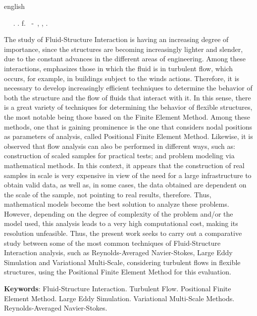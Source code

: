 \documentclass[_ArquivoPrincipal.tex]{subfiles}
\begin{document}
	\begin{resumo}[Abstract]
		\begin{otherlanguage*}{english}
			\begin{flushleft} 
				\setlength{\absparsep}{0pt} %
				\SingleSpacing 
				\imprimirautorabr~ ~\textbf{\imprimirtitleabstract}.	\imprimirdata.  \pageref{LastPage}f. 
				\imprimirtipotrabalho~-~\imprimirinstituicao, \imprimirlocal, 	\imprimirdata. 
			\end{flushleft}
			\OnehalfSpacing 
			The study of Fluid-Structure Interaction is having an increasing degree of importance, since the structures are becoming increasingly lighter and slender, due to the constant advances in the different areas of engineering. Among these interactions, emphasizes those in which the fluid is in turbulent flow, which occurs, for example, in buildings subject to the winds actions. Therefore, it is necessary to develop increasingly efficient techniques to determine the behavior of both the structure and the flow of fluids that interact with it. In this sense, there is a great variety of techniques for determining the behavior of flexible structures, the most notable being those based on the Finite Element Method. Among these methods, one that is gaining prominence is the one that considers nodal positions as parameters of analysis, called Positional Finite Element Method. Likewise, it is observed that flow analysis can also be performed in different ways, such as: construction of scaled samples for practical tests; and problem modeling via mathematical methods. In this context, it appears that the construction of real samples in scale is very expensive in view of the need for a large infrastructure to obtain valid data, as well as, in some cases, the data obtained are dependent on the scale of the sample, not pointing to real results, therefore. Thus, mathematical models become the best solution to analyze these problems. However, depending on the degree of complexity of the problem and/or the model used, this analysis leads to a very high computational cost, making its resolution unfeasible. Thus, the present work seeks to carry out a comparative study between some of the most common techniques of Fluid-Structure Interaction analysis, such as Reynolds-Averaged Navier-Stokes, Large Eddy Simulation and Variational Multi-Scale, considering turbulent flows in flexible structures, using the Positional Finite Element Method for this evaluation.
			\vspace{\onelineskip}
			
			\noindent 
			\textbf{Keywords}: Fluid-Structure Interaction. Turbulent Flow. Positional Finite Element Method. Large Eddy Simulation. Variational Multi-Scale Methods. Reynolds-Averaged Navier-Stokes.
		\end{otherlanguage*}
	\end{resumo}
\end{document}
